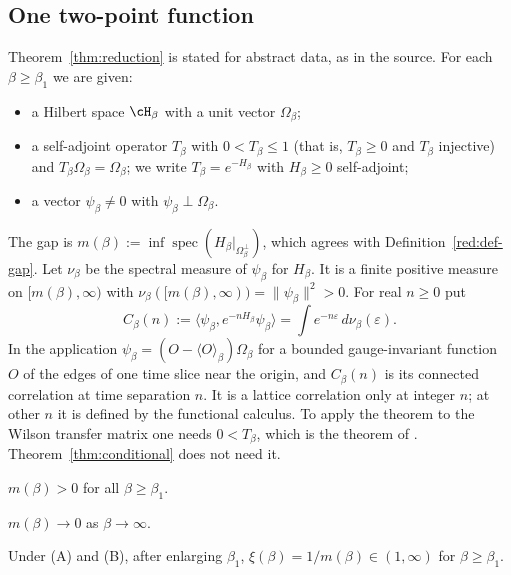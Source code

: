 \subsection{One two-point function}\label{red:R}

Theorem~\ref{thm:reduction} is stated for abstract data, as in the source. For each $\beta\ge\beta_1$ we are given:
\begin{itemize}
\item a Hilbert space $\cH_\beta$ with a unit vector $\Omega_\beta$;
\item a self-adjoint operator $T_\beta$ with $0<T_\beta\le1$ (that is, $T_\beta\ge0$ and $T_\beta$ injective) and $T_\beta\Omega_\beta=\Omega_\beta$; we write $T_\beta=e^{-H_\beta}$ with $H_\beta\ge0$ self-adjoint;
\item a vector $\psi_\beta\ne0$ with $\psi_\beta\perp\Omega_\beta$.
\end{itemize}
The gap is $m(\beta):=\inf\operatorname{spec}(H_\beta|_{\Omega_\beta^\perp})$, which agrees with Definition~\ref{red:def-gap}. Let $\nu_\beta$ be the spectral measure of $\psi_\beta$ for $H_\beta$. It is a finite positive measure on $[m(\beta),\infty)$ with $\nu_\beta([m(\beta),\infty))=\|\psi_\beta\|^2>0$. For real $n\ge0$ put
\begin{equation}\label{red:C}
  C_\beta(n):=\langle\psi_\beta,e^{-nH_\beta}\psi_\beta\rangle=\int e^{-n\varepsilon}\,d\nu_\beta(\varepsilon).
\end{equation}
In the application $\psi_\beta=(O-\langle O\rangle_\beta)\Omega_\beta$ for a bounded gauge-invariant function $O$ of the edges of one time slice near the origin, and $C_\beta(n)$ is its connected correlation at time separation $n$. It is a lattice correlation only at integer $n$; at other $n$ it is defined by the functional calculus. To apply the theorem to the Wilson transfer matrix one needs $0<T_\beta$, which is the theorem of \cite{Lu77}. Theorem~\ref{thm:conditional} does not need it.

\begin{hypothesis}\label{hyp:A}
$m(\beta)>0$ for all $\beta\ge\beta_1$.
\end{hypothesis}

\begin{hypothesis}\label{hyp:B}
$m(\beta)\to0$ as $\beta\to\infty$.
\end{hypothesis}

Under (A) and (B), after enlarging $\beta_1$, $\xi(\beta)=1/m(\beta)\in(1,\infty)$ for $\beta\ge\beta_1$.

